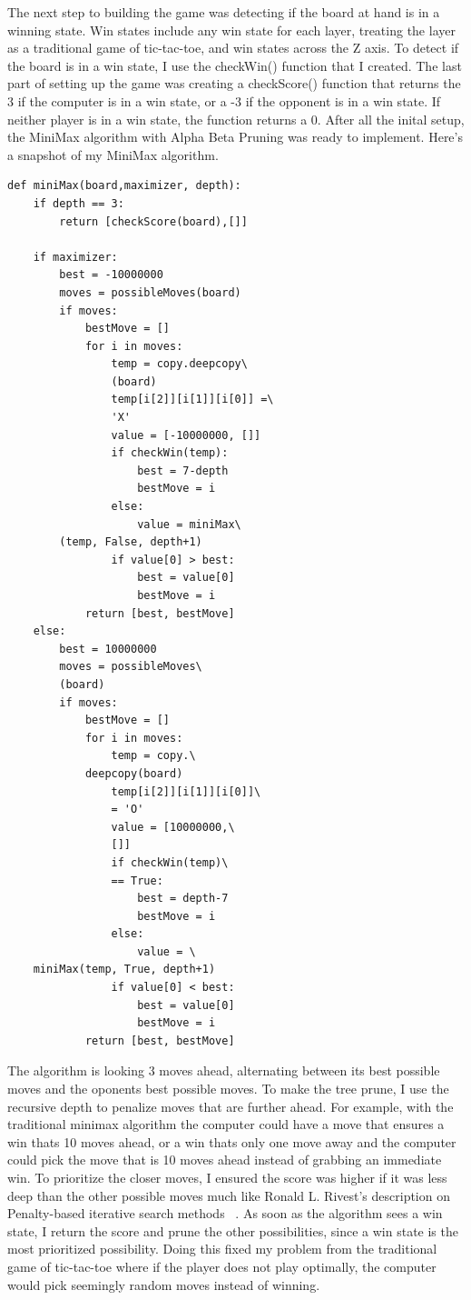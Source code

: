 \documentclass[letterpaper]{article}
\begin{document}
The next step to building the game was detecting if the board at hand is in a winning state. Win states include any win state for each layer, treating the layer as a traditional game of tic-tac-toe, and win states across the Z axis. To detect if the board is in a win state, I use the checkWin() function that I created. The last part of setting up the game was creating a checkScore() function that returns the 3 if the computer is in a win state, or a -3 if the opponent is in a win state. If neither player is in a win state, the function returns a 0. After all the inital setup, the MiniMax algorithm with Alpha Beta Pruning was ready to implement. Here's a snapshot of my MiniMax algorithm. 
\begin{lstlisting}
def miniMax(board,maximizer, depth):
    if depth == 3:
        return [checkScore(board),[]]

    if maximizer:
        best = -10000000
        moves = possibleMoves(board)
        if moves:
            bestMove = []
            for i in moves:
                temp = copy.deepcopy\
				(board)
                temp[i[2]][i[1]][i[0]] =\
 				'X'
                value = [-10000000, []]
                if checkWin(temp):
                    best = 7-depth
                    bestMove = i
                else:
                    value = miniMax\
		(temp, False, depth+1)
                if value[0] > best:
                    best = value[0]
                    bestMove = i
            return [best, bestMove]
    else:
        best = 10000000
        moves = possibleMoves\
		(board)
        if moves:
            bestMove = []
            for i in moves:
                temp = copy.\
			deepcopy(board)
                temp[i[2]][i[1]][i[0]]\
 				= 'O'
                value = [10000000,\
 				[]]
                if checkWin(temp)\
 				== True:
                    best = depth-7
                    bestMove = i
                else:
                    value = \
	miniMax(temp, True, depth+1)
                if value[0] < best:
                    best = value[0]
                    bestMove = i
            return [best, bestMove]
\end{lstlisting}
The algorithm is looking 3 moves ahead, alternating between its best possible moves and the oponents best possible moves. To make the tree prune, I use the recursive depth to penalize moves that are further ahead. For example, with the traditional minimax algorithm the computer could have a move that ensures a win thats 10 moves ahead, or a win thats only one move away and the computer could pick the move that is 10 moves ahead instead of grabbing an immediate win. To prioritize the closer moves, I ensured the score was higher if it was less deep than the other possible moves much like Ronald L. Rivest's description on Penalty-based iterative search methods ~\cite{rivest1987}. As soon as the algorithm sees a win state, I return the score and prune the other possibilities, since a win state is the most prioritized possibility. Doing this fixed my problem from the traditional game of tic-tac-toe where if the player does not play optimally, the computer would pick seemingly random moves instead of winning. 
\end{document}
